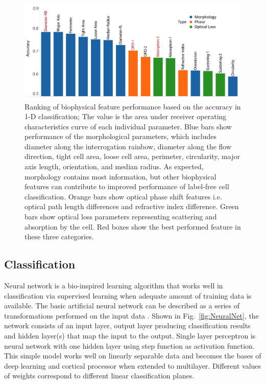 \documentclass[aps,pra,reprint,superscriptaddress]{revtex4-1}
\begin{document}
\begin{figure}
\includegraphics[scale=0.2]{FigureFeaturesRank.jpg}
\caption{\label{fig:FeaturesRank} Ranking of biophysical feature performance based on the accuracy in 1-D classification; The value is the area under receiver operating characteristics curve of each individual parameter. Blue bars show performance of the morphological parameters, which includes diameter along the interrogation rainbow, diameter along the flow direction, tight cell area, loose cell area, perimeter, circularity, major axis length, orientation, and median radius. As expected, morphology contains most information, but other biophysical features can contribute to improved performance of label-free cell classification. Orange bars show optical phase shift features i.e. optical path length differences and refractive index difference. Green bars show optical loss parameters representing scattering and absorption by the cell. Red boxes show the best performed feature in these three categories.}
\end{figure}

\subsection{Classification}

Neural network is a bio-inspired learning algorithm that works well in classification via supervised learning when adequate amount of training data is available. The basic artificial neural network can be described as a series of transformations performed on the input data \cite{bishop2006pattern, boddy1994neural}. Shown in Fig.~\ref{fig:NeuralNet}, the network consists of an input layer, output layer producing classification results and hidden layer(s) that map the input to the output. Single layer perceptron is neural network with one hidden layer using step function as activation function. This simple model works well on linearly separable data and becomes the bases of deep learning and cortical processor when extended to multilayer. Different values of weights correspond to different linear classification planes. 
\end{document}

